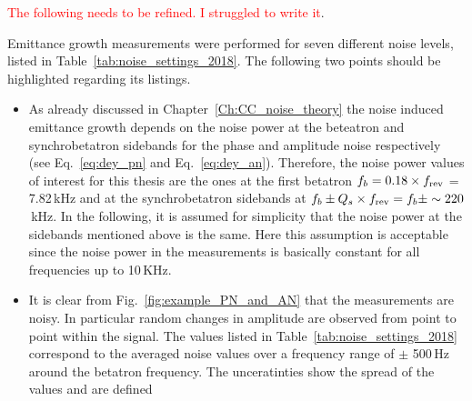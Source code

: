 \textcolor{red}{The following needs to be refined. I struggled to write it}.
\begin{sloppypar} 
Emittance growth measurements were performed for seven different noise levels, listed in Table~\ref{tab:noise_settings_2018}. The following two points should be highlighted regarding its listings. 
\begin{itemize}
    \item As already discussed in Chapter~\ref{Ch:CC_noise_theory} the noise induced emittance growth depends on the noise power at the beteatron and synchrobetatron sidebands for the phase and amplitude noise respectively (see Eq.~\ref{eq:dey_pn} and Eq.~\ref{eq:dey_an}). Therefore, the noise power values of interest for this thesis are the ones at the first betatron $f_b = 0.18 \times {f_\mathrm{rev}}$ = 7.82\,kHz and at the synchrobetatron sidebands at $f_b \pm {Q_s} \times {f_\mathrm{rev}}  = f_b \pm  \sim 220$\,kHz. In the following, it is assumed for simplicity that the noise power at the sidebands mentioned above is the same. Here this assumption is acceptable since the noise power in the measurements is basically constant for all frequencies up to 10\,KHz. 
    \item It is clear from Fig.~\ref{fig:example_PN_and_AN} that the measurements are noisy. In particular random changes in amplitude are observed from point to point within the signal. The values listed in Table~\ref{tab:noise_settings_2018} correspond to the averaged noise values over a frequency range of $\pm$ 500\,Hz around the betatron frequency. The unceratinties show the spread of the values and are defined 
\end{itemize}

\end{sloppypar} 

